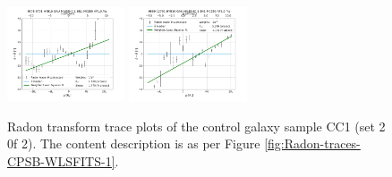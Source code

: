 \begin{figure}
    \includegraphics[width=0.31\textwidth]{Images/WLSFITS/CC1/9508-3701.png}
    \includegraphics[width=0.31\textwidth]{Images/WLSFITS/CC1/9869-12701.png}
%
    \caption{Radon transform trace plots of the control galaxy sample CC1 (set 2 0f 2). The content description is as per Figure \ref{fig:Radon-traces-CPSB-WLSFITS-1}.}
    \label{fig:Radon-traces-CC1-WLSFITS-2}
\end{figure}


